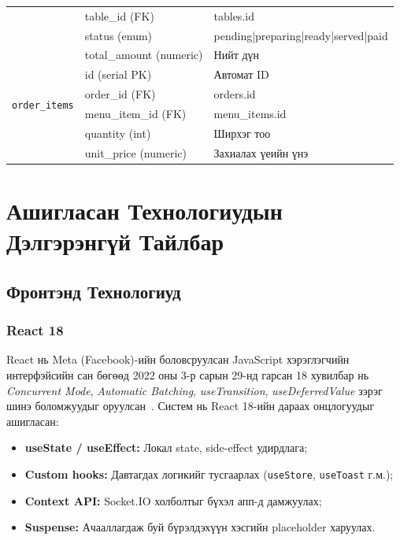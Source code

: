 \documentclass[12pt,a4paper]{article}
\begin{document}
\begin{table}[H]
\begin{tabularx}{\textwidth}{@{}p{2.4cm}p{2.4cm}p{4.8cm}@{}}
  & table\_id (FK)          & tables.id \\
  & status (enum)           & pending|preparing|ready|served|paid \\
  & total\_amount (numeric) & Нийт дүн \\
\midrule
\multirow{4}{*}{\texttt{order\_items}}
  & id (serial PK)          & Автомат ID \\
  & order\_id (FK)          & orders.id \\
  & menu\_item\_id (FK)     & menu\_items.id \\
  & quantity (int)          & Ширхэг тоо \\
  & unit\_price (numeric)   & Захиалах үеийн үнэ \\
\bottomrule
\end{tabularx}
\end{table}

\section{Ашигласан Технологиудын Дэлгэрэнгүй Тайлбар}
\label{sec:tech}

\subsection{Фронтэнд Технологиуд}

\subsubsection{React 18}

React нь Meta (Facebook)-ийн боловсруулсан JavaScript хэрэглэгчийн
интерфэйсийн сан бөгөөд 2022 оны 3-р сарын 29-нд гарсан 18 хувилбар
нь \textit{Concurrent Mode}, \textit{Automatic Batching},
\textit{useTransition}, \textit{useDeferredValue} зэрэг шинэ
боломжуудыг оруулсан~\cite{react18}. Систем нь React 18-ийн
дараах онцлогуудыг ашигласан:

\begin{itemize}
  \item \textbf{useState / useEffect:} Локал state, side-effect
        удирдлага;
  \item \textbf{Custom hooks:} Давтагдах логикийг тусгаарлах
        (\texttt{useStore}, \texttt{useToast} г.м.);
  \item \textbf{Context API:} Socket.IO холболтыг бүхэл апп-д
        дамжуулах;
  \item \textbf{Suspense:} Ачааллагдаж буй бүрэлдэхүүн хэсгийн
        placeholder харуулах.
\end{itemize}
\end{document}
